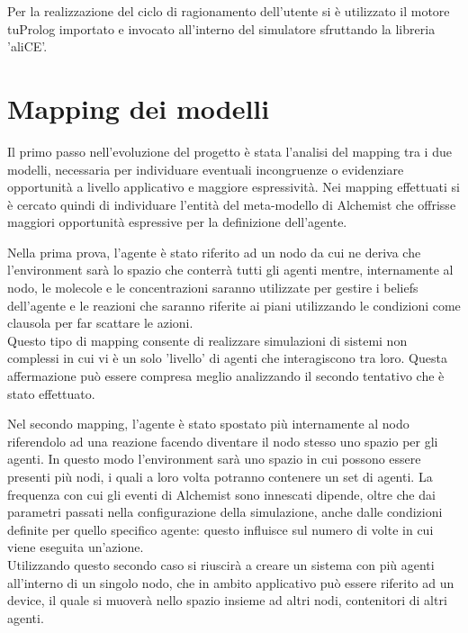 \documentclass[12pt,a4paper,openright,twoside]{report}
\begin{document}
Per la realizzazione del ciclo di ragionamento dell'utente si \`e utilizzato il motore tuProlog importato e invocato all'interno del simulatore sfruttando la libreria 'aliCE'.

\section{Mapping dei modelli}
Il primo passo nell'evoluzione del progetto \`e stata l'analisi del mapping tra i due modelli, necessaria per individuare eventuali incongruenze o evidenziare opportunit\`a a livello applicativo e maggiore espressivit\`a.
Nei mapping effettuati si \`e cercato quindi di individuare l'entit\`a del meta-modello di Alchemist che offrisse maggiori opportunit\`a espressive per la definizione dell'agente.

Nella prima prova, l'agente \`e stato riferito ad un nodo da cui ne deriva che l'environment sar\`a lo spazio che conterr\`a tutti gli agenti mentre, internamente al nodo, le molecole e le concentrazioni saranno utilizzate per gestire i beliefs dell'agente e le reazioni che saranno riferite ai piani utilizzando le condizioni come clausola per far scattare le azioni.
\\
Questo tipo di mapping consente di realizzare simulazioni di sistemi non complessi in cui vi \`e un solo 'livello' di agenti che interagiscono tra loro. Questa affermazione pu\`o essere compresa meglio analizzando il secondo tentativo che \`e stato effettuato.

Nel secondo mapping, l'agente \`e stato spostato pi\`u internamente al nodo riferendolo ad una reazione facendo diventare il nodo stesso uno spazio per gli agenti. In questo modo l'environment sar\`a uno spazio in cui possono essere presenti pi\`u nodi, i quali a loro volta potranno contenere un set di agenti. La frequenza con cui gli eventi di Alchemist sono innescati dipende, oltre che dai parametri passati nella configurazione della simulazione, anche dalle condizioni definite per quello specifico agente: questo influisce sul numero di volte in cui viene eseguita un'azione.
\\
Utilizzando questo secondo caso si riuscir\`a a creare un sistema con pi\`u agenti all'interno di un singolo nodo, che in ambito applicativo pu\`o essere riferito ad un device, il quale si muover\`a nello spazio insieme ad altri nodi, contenitori di altri agenti.

\end{document}
